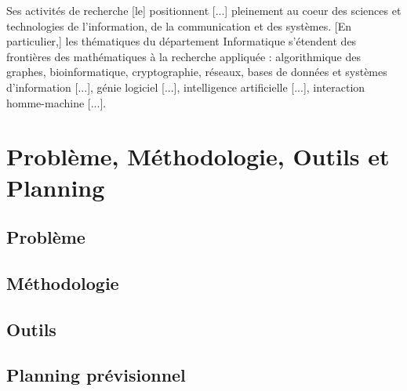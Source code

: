 \documentclass[a4paper,12pt]{book}
\theoremstyle{break}
\theoremstyle{break}
\theoremstyle{definition}
\theoremstyle{remark}
\begin{document}
Ses activités de recherche [le] positionnent [...] pleinement au coeur des sciences et technologies de l’information, de la communication et des systèmes. [En particulier,] les thématiques du département Informatique s’étendent des frontières des mathématiques à la recherche appliquée : algorithmique des graphes, bioinformatique, cryptographie, réseaux, bases de données et systèmes d'information [...], génie logiciel [...], intelligence artificielle [...], interaction homme-machine [...]. \fg{} \citep{lirmmPres}

\chapter{Problème, Méthodologie, Outils et Planning}
\section{Problème}
\section{Méthodologie}

\section{Outils}

\section{Planning prévisionnel}
\end{document}
